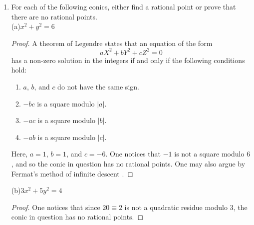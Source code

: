 \documentclass[11pt, oneside]{article}
\begin{document}
\begin{enumerate}
$$$$
into the integral of a rational function in $t$.
\begin{proof}
If $t = \tan(\theta/2)$, then one finds that
$$
\cos\theta = \frac{1-t^2}{1+t^2} \quad\textrm{and}\quad \sin\theta = \frac{2t}{1+t^2}.
$$
Since
$$
d\theta = \frac{2dt}{1+t^2},
$$
one can determine that
$$
\int \frac{a+b\cos\theta + c\sin\theta}{d+e\cos\theta + f\sin \theta}\,d\theta = 2\int \frac{at^2-bt^2+2ct+a+b}{dt^4-et^4+2ft^3 + 2dt^2 + 2ft +d+e}\,dt.
$$
\end{proof}
(b) Evaluate the integral
$$
\int \frac{a+b\cos \theta + c\sin\theta}{1+\cos\theta+\sin\theta}\,d\theta.
$$
\begin{proof}
Using what was derived in (a), one attains an equivalent form of the integral in question:
$$
\int\frac{(a-b)t^2 + 2c t +a +b}{t^3+t^2+t+1}\,dt.
$$
This antiderivative comes out to
$$
(a-c)\log|t+1| + \frac{(c-b)\log(t^2+1)}{2} + (c+b)\arctan t + C.
$$
Substituting $t=\tan(\theta/2)$, one determines that the antiderivative in question evaluates to
$$
(a-c)\log\left|\tan(\theta/2) + 1\right| + \frac{(c-b)\log(\tan^2(\theta/2) +1) + (b+c)\theta}{2} + C.
$$
\end{proof}
\item For each of the following conics, either find a rational point or prove that there are no rational points.\\
(a)\qquad $x^2+y^2=6$
\begin{proof}
A theorem of Legendre states that an equation of the form
$$
aX^2 + bY^2 + cZ^2 = 0
$$
has a non-zero solution in the integers if and only if the following conditions hold:
\begin{enumerate}[label =\arabic*.]
\item$a$, $b$, and $c$ do not have the same sign.
\item $-bc$ is a square modulo $|a|$.
\item $-ac$ is a square modulo $|b|$.
\item $-ab$ is a square modulo $|c|$.
\end{enumerate}
Here, $a=1$, $b=1$, and $c=-6$. One notices that $-1$ is not a square modulo $6$, and so the conic in question has no rational points. One may also argue by Fermat's method of infinite descent \cite{rad6}.
\end{proof}
(b)\qquad $3x^2+5y^2=4$
\begin{proof}
One notices that since $20\equiv 2$ is not a quadratic residue modulo $3$, the conic in question has no rational points. 
\end{proof}

\end{enumerate}
\end{document}

